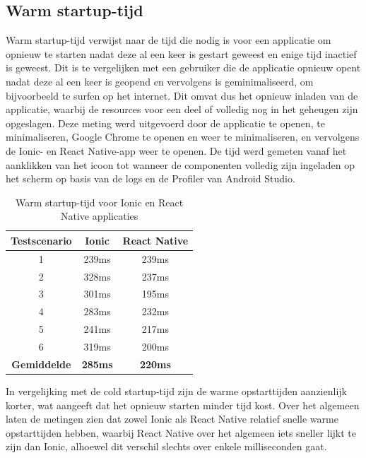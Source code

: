 \subsection{Warm startup-tijd}
\label{subsec:warm-startup-tijd}

Warm startup-tijd verwijst naar de tijd die nodig is voor een applicatie om opnieuw te starten nadat deze al een keer is gestart geweest en enige tijd inactief is geweest. Dit is te vergelijken met een gebruiker die de applicatie opnieuw opent nadat deze al een keer is geopend en vervolgens is geminimaliseerd, om bijvoorbeeld te surfen op het internet. Dit omvat dus het opnieuw inladen van de applicatie, waarbij de resources voor een deel of volledig nog in het geheugen zijn opgeslagen. Deze meting werd uitgevoerd door de applicatie te openen, te minimaliseren, Google Chrome te openen en weer te minimaliseren, en vervolgens de Ionic- en React Native-app weer te openen. De tijd werd gemeten vanaf het aanklikken van het icoon tot wanneer de componenten volledig zijn ingeladen op het scherm op basis van de logs en de Profiler van Android Studio.

\begin{table}[htbp]
  \centering
  \begin{tabular}{|c|c|c|}
  \hline
  \textbf{Testscenario} & \textbf{Ionic} & \textbf{React Native} \\
  \hline
  1 & 239ms & 239ms \\
  \hline
  2 & 328ms & 237ms \\
  \hline
  3 & 301ms & 195ms \\
  \hline
  4 & 283ms & 232ms \\
  \hline
  5 & 241ms & 217ms \\
  \hline
  6 & 319ms & 200ms \\
  \hline
  \textbf{Gemiddelde} & \textbf{285ms} & \textbf{220ms} \\
  \hline
  \end{tabular}
  \caption{Warm startup-tijd voor Ionic en React Native applicaties}
  \label{tab:warm_startup}
\end{table}

In vergelijking met de cold startup-tijd zijn de warme opstarttijden aanzienlijk korter, wat aangeeft dat het opnieuw starten minder tijd kost. Over het algemeen laten de metingen zien dat zowel Ionic als React Native relatief snelle warme opstarttijden hebben, waarbij React Native over het algemeen iets sneller lijkt te zijn dan Ionic, alhoewel dit verschil slechts over enkele milliseconden gaat.


